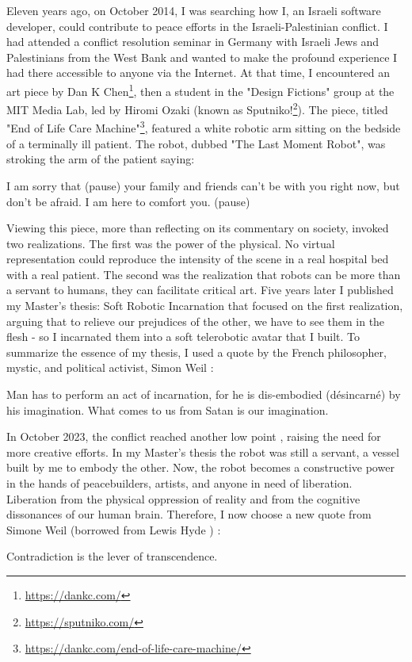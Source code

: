 \documentclass[dissertation,math,vertlayout,pdfa,colorlinks]{aaltoseries}
\begin{document}
\begin{preface}[Lahti]
Eleven years ago, on October 2014, I was searching how I, an Israeli software developer, could contribute to peace efforts in the Israeli-Palestinian conflict. I had attended a conflict resolution seminar in Germany with Israeli Jews and Palestinians from the West Bank and wanted to make the profound experience I had there accessible to anyone via the Internet. At that time, I encountered an art piece by Dan K Chen\footnote{\url{https://dankc.com/}}, then a student in the "Design Fictions" group at the MIT Media Lab, led by Hiromi Ozaki (known as Sputniko!\footnote{\url{https://sputniko.com/}}). The piece, titled "End of Life Care Machine"\footnote{\url{https://dankc.com/end-of-life-care-machine/}}, featured a white robotic arm sitting on the bedside of a terminally ill patient. The robot, dubbed "The Last Moment Robot", was stroking the arm of the patient saying:
\begin{displayquote}
I am sorry that (pause) your family and friends can’t be with you right now, but don’t be afraid. I am here to comfort you. (pause)
\end{displayquote}
Viewing this piece, more than reflecting on its commentary on society, invoked two realizations. The first was the power of the physical. No virtual representation could reproduce the intensity of the scene in a real hospital bed with a real patient. The second was the realization that robots can be more than a servant to humans, they can facilitate critical art. 
\vfil \break
Five years later I published my Master's thesis: Soft Robotic Incarnation \cite{peledSoftRoboticIncarnation2019} that focused on the first realization, arguing that to relieve our prejudices of the other, we have to see them in the flesh - so I incarnated them into a soft telerobotic avatar that I built. To summarize the essence of my thesis, I used a quote by the French philosopher, mystic, and political activist, Simon Weil \cite[p. 54]{weilGravityGrace2002}:
\begin{displayquote}
Man has to perform an act of incarnation, for he is dis-embodied (désincarné) by his imagination. What comes to us from Satan is our imagination.
\end{displayquote}

In October 2023, the conflict reached another low point \cite{bymanWarTheyBoth2024}, raising the need for more creative efforts. In my Master's thesis the robot was still a servant, a vessel built by me to embody the other. Now, the robot becomes a constructive power in the hands of peacebuilders, artists, and anyone in need of liberation. Liberation from the physical oppression of reality and from the cognitive dissonances of our human brain. Therefore, I now choose a new quote from Simone Weil (borrowed from Lewis Hyde \cite{hydeTricksterMakesThis2017}) \cite[p. 134]{weilFirstLastNotebooks1970}:
\begin{displayquote}
Contradiction is the lever of transcendence.
\end{displayquote}

\end{preface}
\end{document}
